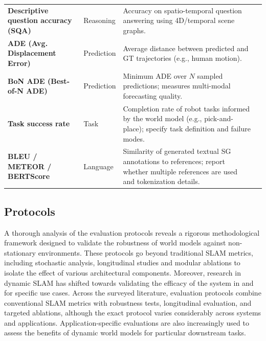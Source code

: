\begin{table}[!htbp]
\begin{tabularx}{\textwidth}{@{}X l X@{} r}
\textbf{Descriptive question accuracy (SQA)} & Reasoning &
Accuracy on spatio-temporal question answering using 4D/temporal scene graphs. 
& \cite{gorlo_describe_2025}\\
\textbf{ADE (Avg. Displacement Error)} & Prediction &
Average distance between predicted and GT trajectories (e.g., human motion). 
& \cite{gorlo_long-term_2024}\\
\textbf{BoN ADE (Best-of-N ADE)} & Prediction &
Minimum ADE over $N$ sampled predictions; measures multi-modal forecasting quality. 
& \cite{gorlo_long-term_2024}\\
\textbf{Task success rate} & Task &
Completion rate of robot tasks informed by the world model (e.g., pick-and-place); specify task definition and failure modes. 
& \cite{yan_dynamic_2025}\\
\textbf{BLEU / METEOR / BERTScore} & Language &
Similarity of generated textual SG annotations to references; report whether multiple references are used and tokenization details. 
& \cite{linok_dygenc_2025}\\

\bottomrule
\end{tabularx}
\end{table}


\subsection{Protocols}\label{sec:evaluation_metrics_protocols}
A thorough analysis of the evaluation protocols reveals a rigorous methodological framework designed to validate the robustness of world models against non-stationary environments.
These protocols go beyond traditional SLAM metrics, including stochastic analysis, longitudinal studies and modular ablations to isolate the effect of various architectural components. 
Moreover, research in dynamic SLAM has shifted towards validating the efficacy of the system in and for specific use cases.
Across the surveyed literature, evaluation protocols combine conventional SLAM metrics with robustness tests, longitudinal evaluation, and targeted ablations, although the exact protocol varies considerably across systems and applications. Application-specific evaluations are also increasingly used to assess the benefits of dynamic world models for particular downstream tasks.


